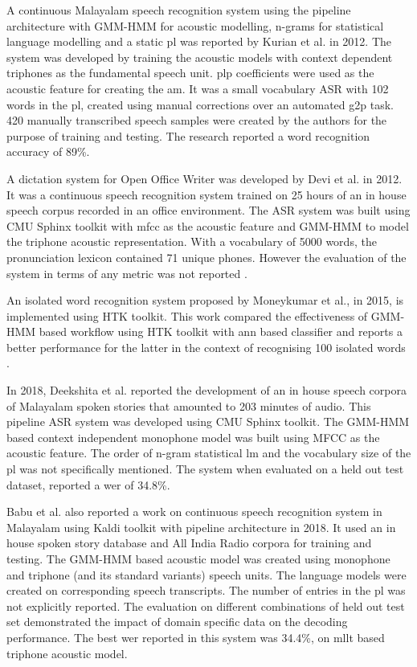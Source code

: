 \begin{enumerate}
    A continuous Malayalam speech recognition system using the pipeline architecture with GMM-HMM for acoustic modelling, n-grams for statistical language modelling and a static \gls{pl} was reported by Kurian et al. \cite{kurian_continuous_2012} in 2012. The system was developed by training the acoustic models with context dependent triphones as the fundamental speech unit. \gls{plp} coefficients were used as the acoustic feature for creating the \gls{am}. It was a small vocabulary ASR with 102 words in the \gls{pl}, created using manual corrections over an automated \gls{g2p} task. 420 manually transcribed speech samples were created by the authors for the purpose of training and testing.  The research reported a word  recognition accuracy of 89\%. 

    
    A dictation system for Open Office Writer was developed by Devi et al. in 2012. It was a continuous speech recognition system trained on  25 hours of an in house speech  corpus recorded in an office environment. The ASR system was built using CMU Sphinx toolkit with \gls{mfcc} as the acoustic feature and GMM-HMM to model the triphone acoustic representation. With a vocabulary of 5000 words, the pronunciation lexicon contained 71 unique phones. However the evaluation of the system in terms of any metric was not reported \cite{devi2012implementation}.
    
    An isolated word recognition system proposed by Moneykumar et al., in 2015, is implemented using HTK toolkit. This work compared the effectiveness of GMM-HMM based workflow using HTK toolkit with \gls{ann} based classifier and reports a better performance for the latter in the context of recognising 100 isolated words \cite{moneykumar-etal-2015-isolated}. 
    

    In 2018, Deekshita et al. \cite{deekshitha2018development} reported the development of an in house speech corpora of Malayalam spoken stories that amounted to 203 minutes of audio. This pipeline ASR system was developed using CMU Sphinx toolkit. The GMM-HMM based context independent monophone model was built using MFCC as the acoustic feature. The order of n-gram statistical \gls{lm} and the vocabulary size of the \gls{pl} was not specifically mentioned. The system when evaluated on a  held out test dataset, reported a \gls{wer} of 34.8\%. 


    Babu et al. \cite{lavanya2018} also reported a work on continuous speech recognition system in Malayalam using Kaldi toolkit with pipeline architecture in 2018. It used an in house spoken story database and All India Radio corpora for training and testing. The GMM-HMM based acoustic model was created using monophone and triphone (and its standard variants) speech units. The language models were created on corresponding speech transcripts. The number of entries in the \gls{pl} was not explicitly reported. The evaluation on different combinations of held out test set demonstrated the impact of domain specific data on the decoding performance. The best \gls{wer} reported in this system was 34.4\%, on \gls{mllt} based triphone acoustic model.


\end{enumerate}
